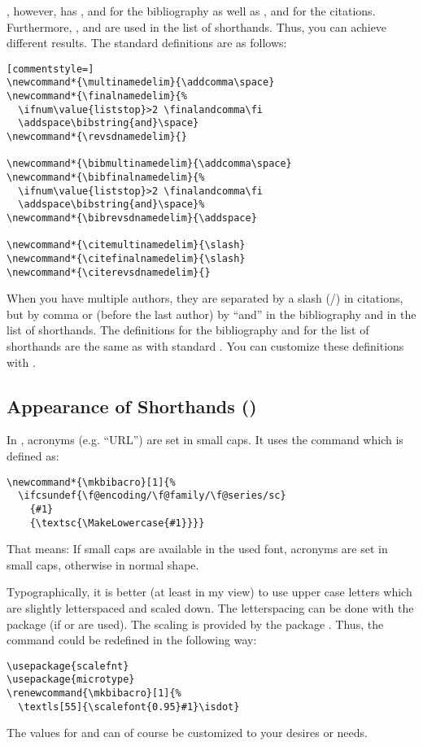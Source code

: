 \documentclass[english]{scrartcl}
\begin{document}
\bldw{}, however, has , 
and  for the bibliography as well as
,  and
 for the citations. Furthermore, , 
 and  are used in the list of
shorthands. Thus, you can achieve different results. The standard definitions
are as follows:

\begin{lstlisting}[commentstyle=]
\newcommand*{\multinamedelim}{\addcomma\space}
\newcommand*{\finalnamedelim}{%
  \ifnum\value{liststop}>2 \finalandcomma\fi
  \addspace\bibstring{and}\space}
\newcommand*{\revsdnamedelim}{}

\newcommand*{\bibmultinamedelim}{\addcomma\space}
\newcommand*{\bibfinalnamedelim}{%
  \ifnum\value{liststop}>2 \finalandcomma\fi
  \addspace\bibstring{and}\space}%
\newcommand*{\bibrevsdnamedelim}{\addspace}

\newcommand*{\citemultinamedelim}{\slash}
\newcommand*{\citefinalnamedelim}{\slash}
\newcommand*{\citerevsdnamedelim}{}
\end{lstlisting}
When you have multiple authors, they are separated by a slash (/) in citations,
but by comma or (before the last author) by \enquote{and} in the bibliography
and in the list of shorthands. The definitions for the bibliography and for
the list of shorthands are the same as with standard \bl{}. You can customize
these definitions with .

\subsection{Appearance of Shorthands ()}
\label{mkbibacro-anpassen}

In \bl{}, acronyms (e.g. \enquote{\textsc{URL}}) are set in small caps.
It uses the command  which is defined as:
\begin{lstlisting}
\newcommand*{\mkbibacro}[1]{%
  \ifcsundef{\f@encoding/\f@family/\f@series/sc}
    {#1}
    {\textsc{\MakeLowercase{#1}}}}
\end{lstlisting}
That means: If small caps are available in the used font, acronyms are set
in small caps, otherwise in normal shape.

Typographically, it is better (at least in my view) to use upper case letters
which are slightly letterspaced and scaled down. The letterspacing can be
done with the package  (if  or 
are used). The scaling is provided by the package . Thus, the
command  could be redefined in the following way:
\begin{lstlisting}
\usepackage{scalefnt}
\usepackage{microtype}
\renewcommand{\mkbibacro}[1]{%
  \textls[55]{\scalefont{0.95}#1}\isdot}
\end{lstlisting}
The values for  and  can of course be customized to
your desires or needs.
\end{document}
